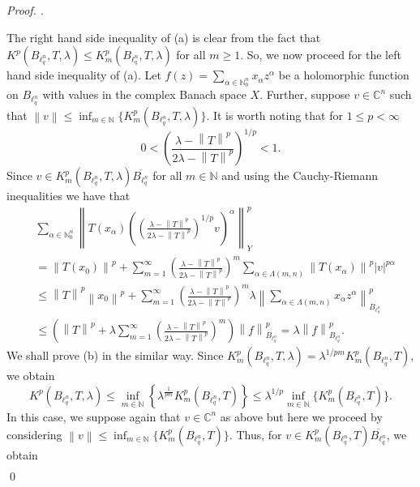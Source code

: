 \documentclass[a4paper,12pt]{amsart}
\theoremstyle{definition}
\newenvironment{pf}[1][]{%
 \vskip 3mm
 \noindent
 \ifthenelse{\equal{#1}{}}%
  {{\slshape Proof. }}%
  {{\slshape #1.} }%
 }%
{\qed\bigskip}
\newcommand{\norm}[1]{\left\lVert#1\right\rVert}
\begin{document}
\begin{pf}
	The right hand side inequality of (a) is clear from the fact that $K^p(B_{\ell^n_{q}},T, \lambda)\leq K^p_{m}(B_{\ell^n_{q}},T, \lambda)$ for all $m\geq 1$. So, we now proceed for the left hand side inequality of (a). Let $f(z)=\sum_{\alpha\in \mathbb{N}^n_{0}}x_{\alpha}z^{\alpha}$ be a holomorphic function on $B_{\ell^n_q}$ with values in the complex Banach space $X$. Further, suppose $v\in \mathbb{C}^n$ such that $\norm{v}\leq \inf_{m\in \mathbb{N}}\{K^p_{m}(B_{\ell^n_{q}},T, \lambda)\}.$
	It is worth noting that for $1\leq p<\infty$
	\begin{equation*}
		0<	\left(\frac{\lambda-\norm{T}^p}{2\lambda-\norm{T}^p}\right)^{1/p}<1.
	\end{equation*}
	Since $v\in K^p_{m}(B_{\ell^n_{q}},T,\lambda)\overline{B_{\ell^n_{q}}}$ for all $m\in \mathbb{N}$ and using the Cauchy-Riemann inequalities we have that
	\begin{align*}
		&\sum_{\alpha\in \mathbb{N}^n_{0}}\norm{T(x_{\alpha})\left(\left(\frac{\lambda-\norm{T}^p}{2\lambda-\norm{T}^p}\right)^{1/p} v\right)^{\alpha}}^p_{Y} \\[2mm]&= \norm{T(x_0)}^p+\sum_{m=1}^{\infty}\left(\frac{\lambda-\norm{T}^p}{2\lambda-\norm{T}^p}\right)^{m}\sum_{\alpha \in\Lambda(m,n)}\norm{T(x_{\alpha})}^p|v|^{p\alpha} \\[2mm]&
		\leq \norm{T}^p\norm{x_0}^p + \sum_{m=1}^{\infty}\left(\frac{\lambda-\norm{T}^p}{2\lambda-\norm{T}^p}\right)^{m} \lambda \norm{\sum_{\alpha \in\Lambda(m,n)}x_{\alpha}z^{\alpha}}^p_{B_{\ell^n_q}}\\[2mm]&
		\leq \left(\norm{T}^p + \lambda \sum_{m=1}^{\infty} \left(\frac{\lambda-\norm{T}^p}{2\lambda-\norm{T}^p}\right)^m\right)\norm{f}^p_{B_{\ell^n_q}}=\lambda \norm{f}^p_{B_{\ell^n_q}}.
	\end{align*}
	We shall prove (b) in the similar way. Since $K^p_m(B_{\ell^n_q},T,\lambda)=\lambda^{1/pm}K^p_m(B_{\ell^n_q},T)$, we obtain 
	\begin{equation*}
		K^p(B_{\ell^n_q},T,\lambda)\leq \inf_{m\in \mathbb{N}} \left\{\lambda^{\frac{1}{pm}}K^p_m(B_{\ell^n_q},T)\right\}\leq \lambda^{1/p} \inf_{m\in \mathbb{N}}\{K^p_m(B_{\ell^n_q},T)\}.
	\end{equation*}
	In this case, we suppose again that $v\in \mathbb{C}^n$ as above but here we proceed by considering $\norm{v}\leq \inf_{m\in \mathbb{N}} \{K^p_m(B_{\ell^n_q},T)\}$. Thus, for $v\in K^p_m(B_{\ell^n_q},T)\overline{B_{\ell^n_{q}}}$, we obtain
	\begin{align*}

\end{align*}
\end{pf}
\end{document}
